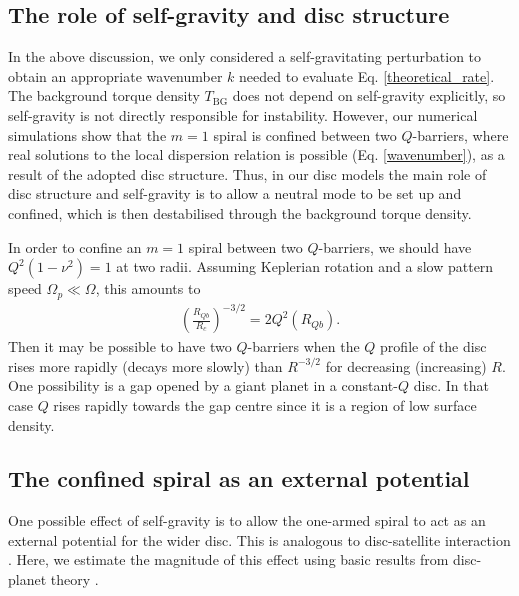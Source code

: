 

\subsection{The role of self-gravity and disc structure} 
In the above discussion, we only considered a self-gravitating
perturbation to obtain an appropriate wavenumber $k$ needed to
evaluate Eq. \ref{theoretical_rate}. 
The background torque density $T_\mathrm{BG}$ does not depend on  
self-gravity explicitly, so self-gravity is not directly
responsible for instability. However, 
our numerical simulations show that the $m=1$ spiral is
confined between two $Q$-barriers, where real solutions to the local
dispersion relation is possible (Eq. \ref{wavenumber}), as a result of the adopted disc
structure. Thus, in our disc models the main role of disc structure and self-gravity is to 
allow a neutral mode to be set up and confined, which is then
destabilised through the background torque density. 

In order to confine an $m=1$ spiral between two $Q$-barriers, we
should have $Q^2(1-\nu^2)=1$ at two radii. Assuming 
Keplerian rotation and a slow pattern speed $\Omega_p\ll\Omega$, this amounts to
\begin{align}
  \left(\frac{R_{Qb}}{R_c}\right)^{-3/2} = 2Q^2(R_{Qb}). 
\end{align}
Then it may be possible to have two $Q$-barriers when the $Q$ profile
of the disc rises more rapidly (decays more slowly) than $R^{-3/2}$
for decreasing (increasing) $R$. One possibility is a gap
opened by a giant planet in a constant-$Q$ disc. In that case $Q$
rises rapidly towards the gap centre since it is a region of low
surface density.  %






\subsection{The confined spiral as an external potential}
One possible effect of self-gravity is to allow the one-armed spiral  
to act as an external potential for the wider disc. This is
analogous to disc-satellite interaction 
\citep{goldreich79}. Here, we estimate the magnitude of this effect
using basic results from disc-planet theory \citep[see, e.g.][and
references therein]{papaloizou07}.  

